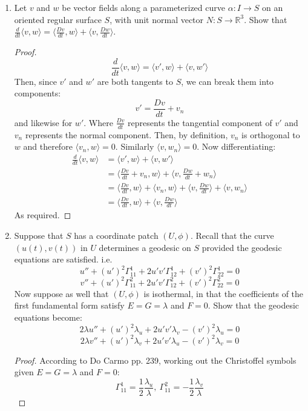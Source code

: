 \documentclass[a4paper,17pt]{extarticle}
\title{\scalebox{1.5}{Math 553 Final Exam}}
\author{\scalebox{1.5}{Theo Koss}}
\date{May 2022}
\theoremstyle{definition}
\newcommand{\R}{\mathbb{R}}
\begin{document}
\maketitle
\begin{enumerate}
\item Let $v$ and $w$ be vector fields along a parameterized curve $\alpha: I\to S$ on an oriented regular surface $S$, with unit normal vector $N:S\to\R^3$. Show that $\frac{d}{dt}\langle v,w\rangle=\langle \frac{Dv}{dt},w\rangle+\langle v,\frac{Dw}{dt}\rangle$.\begin{proof}$$\frac{d}{dt}\langle v,w\rangle=\langle v',w\rangle+\langle v,w'\rangle$$ Then, since $v'$ and $w'$ are both tangents to $S$, we can break them into components: $$v'=\frac{Dv}{dt}+v_n$$ and likewise for $w'$. Where $\frac{Dv}{dt}$ represents the tangential component of $v'$ and $v_n$ represents the normal component. Then, by definition, $v_n$ is orthogonal to $w$ and therefore $\langle v_n,w\rangle=0$. Similarly $\langle v,w_n\rangle=0$. Now differentiating:\begin{align*}
    \frac{d}{dt}\langle v,w\rangle&=\langle v',w\rangle+\langle v,w'\rangle\\
    &=\langle \frac{Dv}{dt}+v_n,w\rangle+\langle v,\frac{Dw}{dt}+w_n\rangle\\
    &=\langle \frac{Dv}{dt},w\rangle+\langle v_n,w\rangle+\langle v,\frac{Dw}{dt}\rangle+\langle v,w_n\rangle\\
    &=\langle \frac{Dv}{dt},w\rangle+\langle v,\frac{Dw}{dt}\rangle
\end{align*}
As required.
\end{proof}
\item Suppose that $S$ has a coordinate patch $(U,\phi)$. Recall that the curve $(u(t),v(t))$ in $U$ determines a geodesic on $S$ provided the geodesic equations are satisfied. i.e. $$u''+(u')^2\Gamma_{11}^1+2u'v'\Gamma_{12}^1+(v')^2\Gamma_{22}^1=0$$ $$v''+(u')^2\Gamma_{11}^2+2u'v'\Gamma_{12}^2+(v')^2\Gamma_{22}^2=0$$ Now suppose as well that $(U,\phi)$ is isothermal, in that the coefficients of the first fundamental form satisfy $E=G=\lambda$ and $F=0$. Show that the geodesic equations become: $$2\lambda u''+(u')^2\lambda_u+2u'v'\lambda_v-(v')^2\lambda_u=0$$ $$2\lambda v''+(u')^2\lambda_v+2u'v'\lambda_u-(v')^2\lambda_v=0$$ \begin{proof} According to Do Carmo pp. 239, working out the Christoffel symbols given $E=G=\lambda$ and $F=0$: $$\Gamma_{11}^1=\frac{1}{2}\frac{\lambda_u}{\lambda},\ \Gamma_{11}^2=-\frac{1}{2}\frac{\lambda_v}{\lambda}$$ 

\end{proof}
\end{enumerate}
\end{document}
